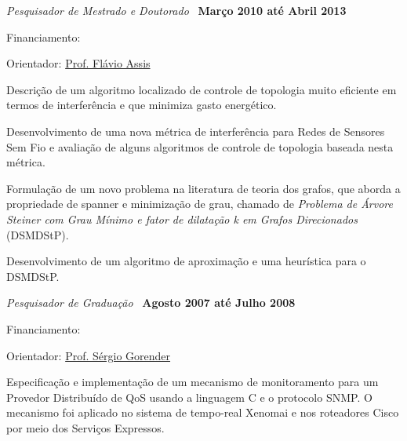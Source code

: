 \documentclass[10pt]{article}
\let\oldcite=\cite
\renewcommand{\cite}[1]{\footnotesize{\textbf{\oldcite{#1}}}\normalsize{}}
\begin{document}
\begin{outerlist}

    \item[] \textit{Pesquisador de Mestrado e Doutorado}~\cite{Braga2011,Braga2012}%
            \hfill \textbf{Março 2010 até Abril 2013}
            \begin{innerlist}
                \item Financiamento:~\cite{Grant2012,Grant2010}
                \item Orientador:
                  \href{http://wiki.dcc.ufba.br/DCC/ProfFlavioAssis}
                       {Prof. Fl\'{a}vio Assis}

                \item Descrição de um algoritmo localizado de controle de topologia muito eficiente em termos de interferência e que minimiza gasto energético.
                  
                \item Desenvolvimento de uma nova métrica de interferência para Redes de Sensores Sem Fio e avaliação de alguns algoritmos de controle de topologia baseada nesta métrica.

                \item Formulação de um novo problema na literatura de teoria dos grafos, que aborda a propriedade de spanner e minimização de grau, chamado de 
                  \emph{Problema de \'Arvore Steiner com Grau M\'inimo e fator de dilata\c{c}\~ao k em Grafos Direcionados} (DSMDStP).
                \item Desenvolvimento de um algoritmo de aproximação e uma
                  heurística para o DSMDStP.
            \end{innerlist}
            
		\item[] \textit{Pesquisador de Graduação}~\cite{Braga2008}%
            \hfill \textbf{Agosto 2007 até Julho 2008}
            \begin{innerlist}
                \item Financiamento:~\cite{Grant2007b}
                \item Orientador:
                  \href{http://wiki.dcc.ufba.br/DCC/ProfSergioGorender}
                   {Prof. S\'{e}rgio Gorender}
                \item Especificação e implementação de um mecanismo de monitoramento para um Provedor Distribuído de QoS usando a linguagem C e o protocolo SNMP. O mecanismo foi aplicado no sistema de tempo-real Xenomai e nos roteadores Cisco por meio dos Serviços Expressos.
            \end{innerlist}

\end{outerlist}
\end{document}
